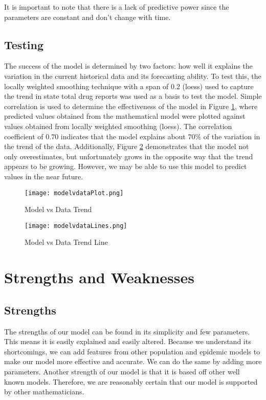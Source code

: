 \documentclass[12pt, letterpaper]{article}
\begin{document}
It is important to note that there is a lack of predictive power since the parameters are constant and don't change with time.

\subsection{Testing}
The success of the model is determined by two factors: how well it explains the variation in the current historical data and its forecasting ability. To test this, the locally weighted smoothing technique with a span of 0.2 (loess) used to capture the trend in state total drug reports was used as a basis to test the model. Simple correlation is used to determine the effectiveness of the model in Figure \ref{fig:modelvdataPlot}, where predicted values obtained from the mathematical model were plotted against values obtained from locally weighted smoothing (loess). The correlation coefficient of 0.70 indicates that the model explains about 70\% of the variation in the trend of the data. Additionally, Figure \ref{fig:modelvdataLines} demonstrates that the model not only overestimates, but unfortunately grows in the opposite way that the trend appears to be growing. However, we may be able to use this model to predict values in the near future.



    \begin{figure}[H]
    \centering
    \texttt{[image: modelvdataPlot.png]}
    \caption{Model vs Data Trend}
    \label{fig:modelvdataPlot}
    \end{figure}
 
    
    \begin{figure}[H]
    \centering
    \texttt{[image: modelvdataLines.png]}
    \caption{Model vs Data Trend Line}
    \label{fig:modelvdataLines}
    \end{figure}


\section{Strengths and Weaknesses}
\subsection{Strengths}
The strengths of our model can be found in its simplicity and few parameters. This means it is easily explained and easily altered. Because we understand its shortcomings, we can add features from other population and epidemic models to make our model more effective and accurate. We can do the same by adding more parameters. Another strength of our model is that it is based off other well known models. Therefore, we are reasonably certain that our model is supported by other mathematicians.
\end{document}
